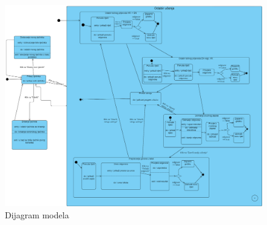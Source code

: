         \begin{figure}[H]
            \includegraphics[width=1.1\textwidth]{dijagrami/Dijagram_stanja.png} 
            \centering
            \caption{Dijagram modela}
            \label{fig:class_diagram}
        \end{figure}			
			
			\eject 
		
